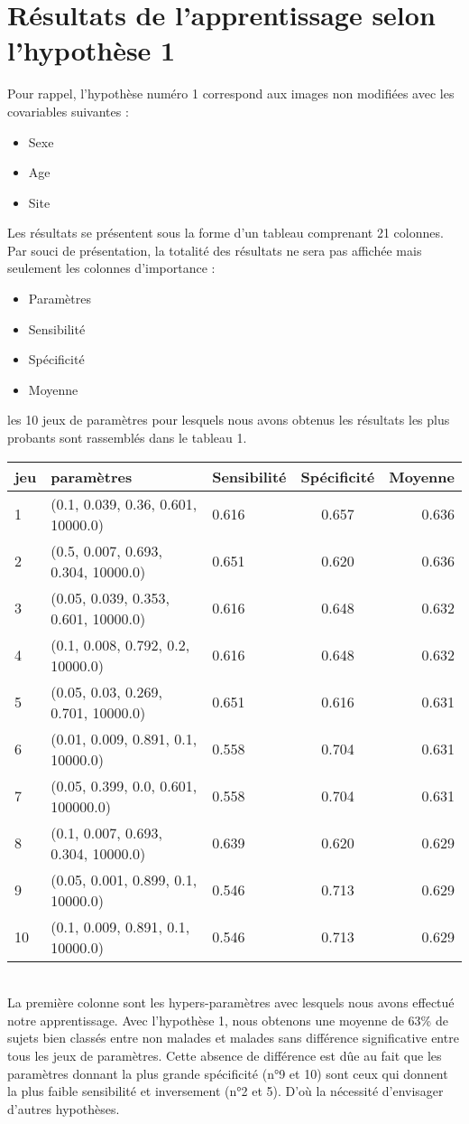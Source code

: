 \section{Résultats de l'apprentissage selon l'hypothèse 1}

Pour rappel, l'hypothèse numéro 1 correspond aux images non modifiées avec les covariables suivantes : 
\begin{itemize}
	\item Sexe
	\item Age
	\item Site
\end{itemize}
Les résultats se présentent sous la forme d'un tableau comprenant 21 colonnes. Par souci de présentation, la totalité des résultats ne sera pas affichée mais seulement les colonnes d'importance :
\begin{itemize}
\item Paramètres
\item Sensibilité
\item Spécificité
\item Moyenne	
\end{itemize}
les 10 jeux de paramètres pour lesquels nous avons obtenus les résultats les plus probants sont rassemblés dans le tableau 1.

\begin{tabular}{|l|l|l|c|r|}
	\hline
	jeu & paramètres & Sensibilité & Spécificité & Moyenne \\
	\hline
	1 & (0.1, 0.039, 0.36, 0.601, 10000.0) & 0.616 & 0.657 & 0.636 \\
	2 & (0.5, 0.007, 0.693, 0.304, 10000.0) & 0.651 & 0.620 & 0.636 \\
	3 & (0.05, 0.039, 0.353, 0.601, 10000.0) & 0.616 & 0.648 & 0.632 \\
	4 & (0.1, 0.008, 0.792, 0.2, 10000.0) &	0.616 & 0.648 &	0.632 \\
	5 & (0.05, 0.03, 0.269, 0.701, 10000.0) & 0.651 & 0.616 & 0.631 \\
	6 & (0.01, 0.009, 0.891, 0.1, 10000.0) & 0.558 & 0.704 & 0.631 \\
	7 & (0.05, 0.399, 0.0, 0.601, 100000.0) & 0.558 & 0.704 & 0.631 \\
	8 & (0.1, 0.007, 0.693, 0.304, 10000.0) & 0.639 & 0.620 & 0.629 \\
	9 & (0.05, 0.001, 0.899, 0.1, 10000.0) & 0.546 & 0.713 & 0.629 \\
	10 & (0.1, 0.009, 0.891, 0.1, 10000.0) & 0.546 & 0.713 & 0.629 \\
	\hline
	
\end{tabular}
\\
La première colonne sont les hypers-paramètres avec lesquels nous avons effectué notre apprentissage. 
Avec l'hypothèse 1, nous obtenons une moyenne de 63\% de sujets bien classés entre non malades et malades sans différence significative entre tous les jeux de paramètres. Cette absence de différence est dûe au fait que les paramètres donnant la plus grande spécificité (n°9 et 10) sont ceux qui donnent la plus faible sensibilité et inversement (n°2 et 5). D'où la nécessité d'envisager d'autres hypothèses. 